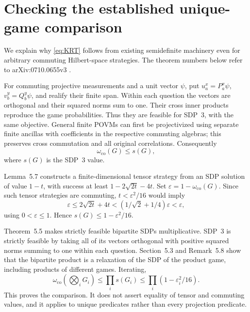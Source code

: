 \documentclass[11pt,reqno]{amsart}
\numberwithin{equation}{section}
\theoremstyle{definition}
\theoremstyle{remark}
\newcommand{\eps}{\varepsilon}
\newcommand{\co}{\mathrm{co}}
\begin{document}
\section{Checking the established unique-game comparison}\label{app:KRT}
We explain why \eqref{eq:KRT} follows from existing semidefinite machinery even for arbitrary commuting Hilbert-space strategies. The theorem numbers below refer to arXiv:0710.0655v3 \cite{KRT}.

For commuting projective measurements and a unit vector \(\psi\), put
\(u_a^x=P_a^x\psi\), \(v_b^y=Q_b^y\psi\), and realify their finite span. Within each question the vectors are orthogonal and their squared norms sum to one. Their cross inner products reproduce the game probabilities. Thus they are feasible for SDP~3, with the same objective. General finite POVMs can first be projectivized using separate finite ancillas with coefficients in the respective commuting algebras; this preserves cross commutation and all original correlations. Consequently
\[
 \omega_{\co}(G)\le s(G),
\]
where \(s(G)\) is the SDP~3 value.

Lemma~5.7 constructs a finite-dimensional tensor strategy from an SDP solution of value \(1-t\), with success at least \(1-2\sqrt{2t}-4t\). Set \(\eps=1-\omega_{\co}(G)\). Since such tensor strategies are commuting, \(t<\eps^2/16\) would imply
\[
 \eps\le2\sqrt{2t}+4t
 <(1/\sqrt2+1/4)\eps<\eps,
\]
using \(0<\eps\le1\). Hence \(s(G)\le1-\eps^2/16\).

Theorem~5.5 makes strictly feasible bipartite SDPs multiplicative. SDP~3 is strictly feasible by taking all of its vectors orthogonal with positive squared norms summing to one within each question. Section~5.3 and Remark~5.8 show that the bipartite product is a relaxation of the SDP of the product game, including products of different games. Iterating,
\[
 \omega_{\co}\left(\bigotimes_iG_i\right)
 \le\prod_i s(G_i)\le\prod_i(1-\eps_i^2/16).
\]
This proves the comparison. It does not assert equality of tensor and commuting values, and it applies to unique predicates rather than every projection predicate.

\end{document}
